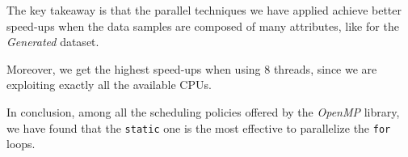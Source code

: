 \documentclass{article}
\begin{document}
The key takeaway is that the parallel techniques we have applied achieve better speed-ups when
the data samples are composed of many attributes, like for the \textit{Generated} dataset.


Moreover, we get the highest speed-ups when using 8 threads, since we are exploiting exactly all the
available CPUs.

In conclusion, among all the scheduling policies offered by the \textit{OpenMP} library, we have
found that the \texttt{static} one is the most effective to parallelize the \texttt{for} loops.
\vspace{-10pt}



\newlength{\graphShift}
\newlength{\axesLineWidth}
\newlength{\gridLineWidth}
\newlength{\graphLineWidth}
\setlength{\graphShift}{0mm}
\setlength{\axesLineWidth}{2pt}
\setlength{\gridLineWidth}{1pt}
\setlength{\graphLineWidth}{2pt}



\end{document}
